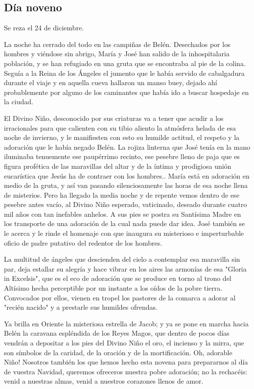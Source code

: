 \documentclass[spanish,utf8,twocolumn]{chlart}
\newenvironment{summary}{\begingroup
	\small\sffamily\itshape%
	\setlength{\leftskip}{3em}\setlength{\rightskip}{3em}\noindent
	}{\par\endgroup}
\newenvironment{lectura}{\begingroup\color{lector}}{\endgroup\par}
\begin{document}
\subsection*{Día noveno}
\begin{summary}
Se reza el 24 de diciembre.
\end{summary}
\begin{lectura}
La noche ha cerrado del todo en las campiñas de Belén.
Desechados por los hombres y viéndose sin abrigo, María y José han
salido de la inhospitalaria población, y se han refugiado en una gruta
que se encontraba al pie de la colina.
Seguía a la Reina de los Ángeles el jumento que le había servido de
cabalgadura durante el viaje y en aquella cueva hallaron un manso buey,
dejado ahí probablemente por alguno de los caminantes que había ido a
buscar hospedaje en la ciudad.

El Divino Niño, desconocido por sus criaturas va a tener que acudir a
los irracionales para que calienten con su tibio aliento la atmósfera
helada de esa noche de invierno, y le manifiesten con esto su humilde
actitud, el respeto y la adoración que le había negado Belén.
La rojiza linterna que José tenía en la mano iluminaba tenuemente ese
paupérrimo recinto, ese pesebre lleno de paja que es figura profética de
las maravillas del altar y de la íntima y prodigiosa unión eucarística
que Jesús ha de contraer con los hombres..
María está en adoración en medio de la gruta, y así van pasando
silenciosamente las horas de esa noche llena de misterios.
Pero ha llegado la media noche y de repente vemos dentro de ese pesebre
antes vacío, al Divino Niño esperado, vaticinado, deseado durante cuatro
mil años con tan inefables anhelos.
A sus pies se postra su Santísima Madre en los transporte de una
adoración de la cual nada puede dar idea.
José también se le acerca y le rinde el homenaje con que inaugura su
misterioso e imperturbable oficio de padre putativo del redentor de los
hombres.

La multitud de ángeles que descienden del cielo a contemplar esa
maravilla sin par, deja estallar su alegría y hace vibrar en los aires
las armonías de esa "Gloria in Excelsis", que es el eco de adoración que
se produce en torno al trono del Altísimo hecha perceptible por un
instante a los oídos de la pobre tierra.
Convocados por ellos, vienen en tropel los pastores de la comarca a
adorar al "recién nacido" y a prestarle sus humildes ofrendas.

Ya brilla en Oriente la misteriosa estrella de Jacob; y ya se pone en
marcha hacia Belén la caravana espléndida de los Reyes Magos, que dentro
de pocos días vendrán a depositar a los pies del Divino Niño el oro, el
incienso y la mirra, que son símbolos de la caridad, de la oración y de
la mortificación.
Oh, adorable Niño!
Nosotros también los que hemos hecho esta novena para prepararnos al día
de vuestra Navidad, queremos ofreceros nuestra pobre adoración; no la
rechacéis:
venid a nuestras almas, venid a nuestros corazones llenos de amor.


\end{lectura}
\end{document}
